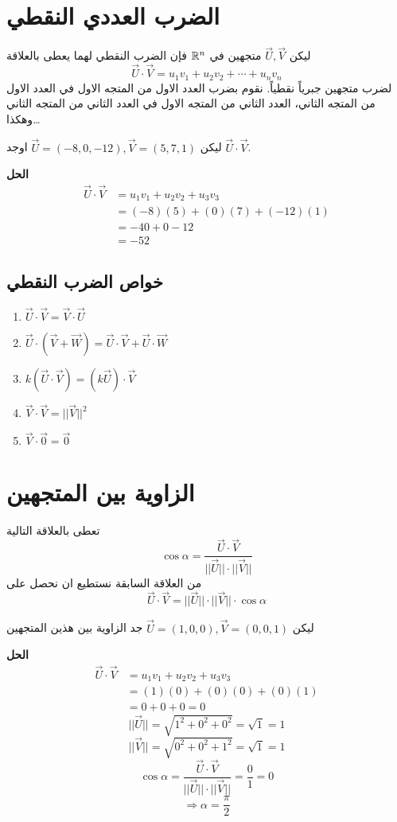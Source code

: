 \section[الضرب العددي النقطي]{الضرب العددي النقطي \cite{key3}}
ليكن $\vec{U}, \vec{V}$ متجهين في $\mathbb{R}^n$ فإن الضرب النقطي لهما يعطى بالعلاقة 
\[
\vec{U} \cdot \vec{V} = u_1v_1 + u_2v_2 + \cdots + u_nv_n
\]
\noindent
لضرب متجهين جبرياً نقطياً. نقوم بضرب العدد الاول من المتجه الاول في العدد الاول من المتجه الثاني، العدد الثاني من المتجه الاول في العدد الثاني من المتجه الثاني وهكذا\dots
\begin{example}
	ليكن 
	$\vec{U} = (-8, 0, -12), \vec{V}=(5,7,1)$
	اوجد $\vec{U}\cdot\vec{V}$.
\end{example}
\noindent
\textbf{الحل}
\begin{align*}
	\vec{U}\cdot\vec{V} &= u_1v_1 + u_2v_2 + u_3v_3\\
	&= (-8)(5) + (0)(7) + (-12)(1)\\
	&= -40 + 0 -12\\
	&= -52
\end{align*}

\subsection*{خواص الضرب النقطي}

\begin{english}
	\begin{enumerate}
		\item $\vec{U}\cdot\vec{V}=\vec{V}\cdot\vec{U}$
		\item $\vec{U}\cdot(\vec{V}+\vec{W}) = \vec{U}\cdot\vec{V} + \vec{U}\cdot\vec{W}$
		\item $k(\vec{U}\cdot\vec{V}) = (k\vec{U})\cdot\vec{V}$
		\item $\vec{V}\cdot\vec{V} = ||\vec{V}||^2$
		\item $\vec{V}\cdot \vec{0} = \vec{0}$
	\end{enumerate}
\end{english}

\section[الزاوية بين المتجهين]{الزاوية بين المتجهين \cite{key2}} 
تعطى بالعلاقة التالية
\[
\cos\alpha = \frac{\vec{U}\cdot\vec{V}}{||\vec{U}|| \cdot ||\vec{V}||}
\]
من العلاقة السابقة نستطيع ان نحصل على
\[
\vec{U}\cdot\vec{V} = ||\vec{U}|| \cdot||\vec{V}||\cdot \cos \alpha
\]

\begin{example}
	ليكن 
	$\vec{U}=(1,0,0), \vec{V}=(0,0,1)$
	جد الزاوية بين هذين المتجهين 
\end{example}
\noindent
\textbf{الحل}
\begin{align*}
	\vec{U}\cdot\vec{V} &= u_1v_1 + u_2 v_2 + u_3 v_3\\
	&= (1)(0) + (0)(0) + (0)(1)\\
	&= 0+0+0=0
\end{align*}
\[
||\vec{U}|| = \sqrt{1^2 + 0^2 + 0^2} = \sqrt{1} =1
\]
\[
||\vec{V}|| = \sqrt{0^2 + 0^2 + 1^2} = \sqrt{1} =1
\]
\[
\cos\alpha = \frac{\vec{U}\cdot\vec{V}}{||\vec{U}|| \cdot ||\vec{V}||} =  \frac{0}{1} = 0
\]
\[
\Rightarrow \alpha =\frac{\pi}{2}
\]

